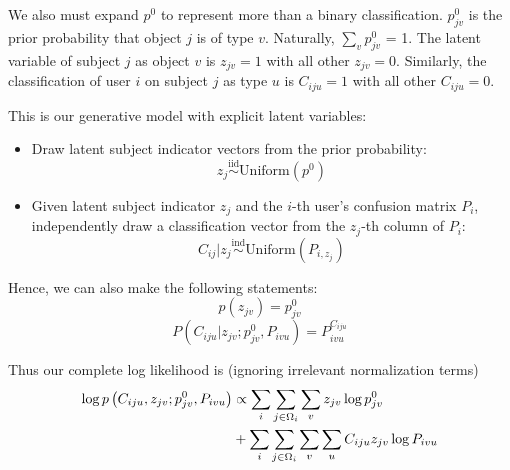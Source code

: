 \documentclass[useAMS,usenatbib,a4paper]{mn2e}
\def\indic#1{\mathbb{I}\left({#1}\right)}
\begin{document}
We also must expand $p^0$ to represent more than a binary classification.
$p_{jv}^0$ is the prior probability that object $j$ is of type $v$. Naturally,
$\sum_v p_{jv}^0$ = 1.
The latent variable of subject $j$ as object $v$ is $z_{jv} = 1$ with all
other $z_{jv} = 0$. Similarly, the classification of user $i$ on subject $j$
as type $u$ is $C_{iju} = 1$ with all other $C_{iju} = 0$.

This is our generative model with explicit latent variables:
\begin{itemize}
  \item{Draw latent subject indicator vectors from the prior probability: $$z_{j}
    \overset{\text{iid}}{\sim} \text{Uniform}\left(p^0\right)$$}
  \item{Given latent subject indicator $z_{j}$ and the $i$-th user's confusion
    matrix $P_i$, independently draw a classification vector from the $z_j$-th column
  of $P_i$: $$C_{ij} | z_{j} \overset{\text{ind}}{\sim}
\text{Uniform}\left(P_{i,z_j}\right)$$}
\end{itemize}
Hence, we can also make the following statements:
\begin{equation}
  p(z_{jv}) = p^0_{jv}
\end{equation}
\begin{equation}
  \label{eq:PCiju}
  P(C_{iju} | z_{jv}; p^0_{jv}, P_{ivu}) = P_{ivu}^{C_{iju}}
\end{equation}

Thus our complete log likelihood is (ignoring irrelevant normalization terms)
\begin{align}
  \log p \left( C_{iju}, z_{jv}; p_{jv}^0, P_{ivu} \right) &\propto \sum_{i} \sum_{j \in
\Omega_i} \sum_{v} z_{jv} \log p_{jv}^0
  \notag\\
  &+ \sum_{i} \sum_{j \in \Omega_i} \sum_{v} \sum_{u} C_{iju} z_{jv} \log P_{ivu}
\end{align}
\end{document}
